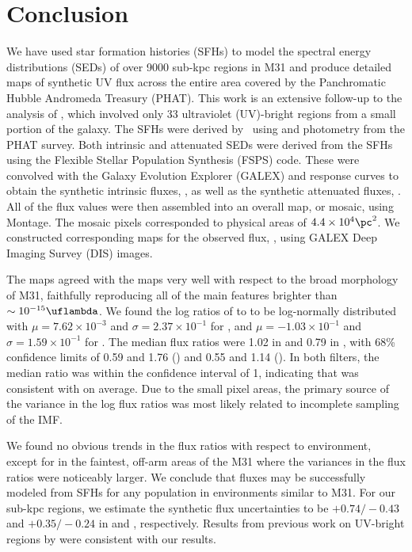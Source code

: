 \section{Conclusion}\label{mfx:conclusion}

We have used star formation histories (SFHs) to model the spectral energy
distributions (SEDs) of over 9000 sub-kpc regions in M31 and produce detailed
maps of synthetic UV flux across the entire area covered by the Panchromatic
Hubble Andromeda Treasury (PHAT). This work is an extensive follow-up to the
analysis of \citet{Simones:2014}, which involved only 33 ultraviolet
(UV)-bright regions from a small portion of the galaxy. The SFHs were derived
by \citet{Lewis:2014}\ using \acsb{} and \acsi{} photometry from the PHAT
survey. Both intrinsic and attenuated SEDs were derived from the SFHs using the
Flexible Stellar Population Synthesis (FSPS) code. These were convolved with
the Galaxy Evolution Explorer (GALEX) \fuv{} and \nuv{} response curves to
obtain the synthetic intrinsic fluxes, \fxsfhz{}, as well as the synthetic
attenuated fluxes, \fxsfh{}. All of the flux values were then assembled into an
overall map, or mosaic, using Montage. The mosaic pixels corresponded to
physical areas of $4.4\times 10^4\pc^2$. We constructed corresponding maps for
the observed flux, \fxobs{}, using GALEX Deep Imaging Survey (DIS) images.

The \fxsfh{} maps agreed with the \fxobs{} maps very well with respect to the
broad morphology of M31, faithfully reproducing all of the main features
brighter than $\sim 10^{-15}\uflambda$. We found the log ratios of \fxsfh{} to
\fxobs{} to be log-normally distributed with $\mu = 7.62\times 10^{-3}$ and
$\sigma = 2.37\times 10^{-1}$ for \fuv{}, and $\mu = -1.03\times 10^{-1}$ and
$\sigma = 1.59\times 10^{-1}$ for \nuv{}. The median flux ratios were 1.02 in
\fuv{} and 0.79 in \nuv{}, with 68\% confidence limits of 0.59 and 1.76
(\fuv{}) and 0.55 and 1.14 (\nuv{}). In both filters, the median ratio was
within the confidence interval of 1, indicating that \fxsfh{} was consistent
with \fxobs{} on average. Due to the small pixel areas, the primary source of
the variance in the log flux ratios was most likely related to incomplete
sampling of the IMF.

We found no obvious trends in the flux ratios with respect to environment,
except for in the faintest, off-arm areas of the M31 where the variances in the
flux ratios were noticeably larger. We conclude that fluxes may be successfully
modeled from SFHs for any population in environments similar to M31. For our
sub-kpc regions, we estimate the synthetic flux uncertainties to be
$+\!0.74/\!-\!0.43$ and $+\!0.35/\!-\!0.24$ in \fuv{} and \nuv{}, respectively.
Results from previous work on UV-bright regions by \citet{Simones:2014} were
consistent with our results.

